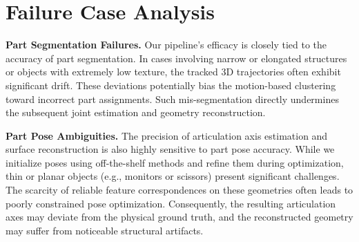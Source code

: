   

\section{Failure Case Analysis}

\noindent\textbf{Part Segmentation Failures.} Our pipeline's efficacy is closely tied to the accuracy of part segmentation. In cases involving narrow or elongated structures or objects with extremely low texture, the tracked 3D trajectories often exhibit significant drift. These deviations potentially bias the motion-based clustering toward incorrect part assignments. Such mis-segmentation directly undermines the subsequent joint estimation and geometry reconstruction.

\noindent\textbf{Part Pose Ambiguities.} The precision of articulation axis estimation and surface reconstruction is also highly sensitive to part pose accuracy. While we initialize poses using off-the-shelf methods and refine them during optimization, thin or planar objects (e.g., monitors or scissors) present significant challenges. The scarcity of reliable feature correspondences on these geometries often leads to poorly constrained pose optimization. Consequently, the resulting articulation axes may deviate from the physical ground truth, and the reconstructed geometry may suffer from noticeable structural artifacts.

